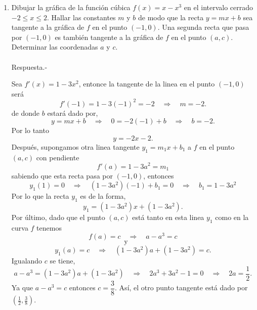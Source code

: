 \begin{enumerate}[\bfseries 1.]
    \item Dibujar la gráfica de la función cúbica $f(x)=x-x^3$ en el intervalo cerrado $-2\leq x\leq 2$. Hallar las constantes $m$ y $b$ de modo que la recta $y=mx+b$ sea tangente a la gráfica de $f$ en el punto $(-1,0)$. Una segunda recta que pasa por $(-1,0)$ es también tangente a la gráfica de $f$ en el punto $(a,c)$. Determinar las coordenadas $a$ y $c$.\\\\
	Respuesta.-\; 
	    \begin{center}
	    \end{center}
	    \vspace{.5cm}
	    Sea $f'(x)=1-3x^2$, entonce la tangente de la linea en el punto $(-1,0)$ será
	    $$f'(-1)=1-3(-1)^2 = -2 \quad \Rightarrow \quad m=-2.$$
	    de donde $b$ estará dado por,
	    $$y=mx+b\quad \Rightarrow \quad 0=-2(-1)+b \quad \Rightarrow \quad b=-2.$$
	    Por lo tanto 
	    $$y=-2x-2.$$
	    Después, supongamos otra linea tangente $y_1=m_1x+b_1$ a $f$ en el punto $(a,c)$ con pendiente 
	    $$f'(a)=1-3a^2=m_1$$
	    sabiendo que esta recta pasa por $(-1,0)$, entonces 
	    $$y_1(1)=0\quad \Rightarrow \quad (1-3a^2)(-1)+b_1=0\quad \Rightarrow \quad b_1=1-3a^2$$
	    Por lo que la recta $y_1$ es de la forma,
	    $$y_1=(1-3a^2)x+(1-3a^2).$$
	    Por último, dado que el punto $(a,c)$ está tanto en esta linea $y_1$ como en la curva $f$ tenemos
	    $$f(a)=c\quad \Rightarrow \quad a-a^3=c$$
	    $$\mbox{y}\qquad$$ 
	    $$y_1(a)=c\quad \Rightarrow \quad (1-3a^2)a+(1-3a^2)=c.$$
	    Igualando $c$ se tiene,
	    $$a-a^3=(1-3a^2)a+(1-3a^2) \quad \Rightarrow\quad 2a^3+3a^2-1=0 \quad \Rightarrow \quad 2a=\dfrac{1}{2}.$$
	    Ya que $a-a^3=c$ entonces $c=\dfrac{3}{8}.$ Así, el otro punto tangente está dado por $\left(\frac{1}{2},\frac{3}{8}\right).$\\\\


\end{enumerate}
